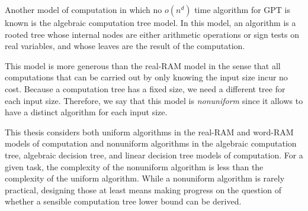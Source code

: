 Another model of computation in which no \(o(n^d)\) time algorithm for GPT
is known is the algebraic computation tree model. In this model,
an algorithm is a rooted tree whose internal nodes are either arithmetic operations or
sign tests on real variables, and whose leaves are the result of the computation.

This model is
more generous than the real-RAM model in the sense that all computations that
can be carried out by only knowing the input size incur no cost.
%
Because a computation tree has a fixed size, we need a different tree for each
input size.
%
Therefore,
we say that this model is \emph{nonuniform} since it allows to have a
distinct algorithm for each input size.

This thesis considers both uniform algorithms in the real-RAM and word-RAM
models of computation and nonuniform algorithms in the algebraic computation
tree, algebraic decision tree, and linear decision tree models of computation.
For a given task, the complexity of the nonuniform algorithm is less than
the complexity of the uniform algorithm. While a nonuniform algorithm is rarely
practical, designing those at least means making progress on the question of
whether a sensible computation tree lower bound can be derived.
